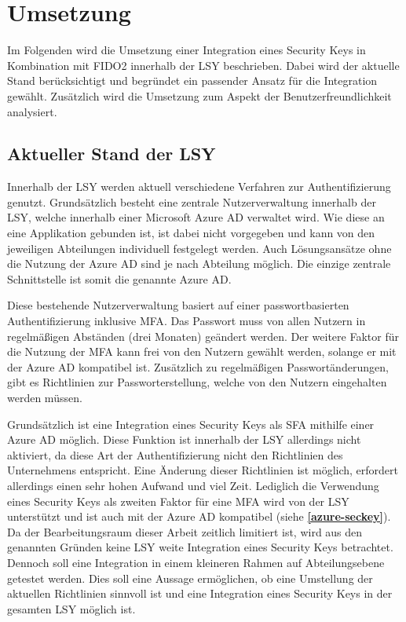 
\chapter{Umsetzung}
Im Folgenden wird die Umsetzung einer Integration eines Security Keys in Kombination mit \ac{FIDO}2 innerhalb der \ac{LSY} beschrieben. Dabei wird der aktuelle Stand berücksichtigt und begründet ein passender Ansatz für die Integration gewählt. Zusätzlich wird die Umsetzung zum Aspekt der Benutzerfreundlichkeit analysiert.

\section{Aktueller Stand der LSY} \label{current}
Innerhalb der \ac{LSY} werden aktuell verschiedene Verfahren zur Authentifizierung genutzt. Grundsätzlich besteht eine zentrale Nutzerverwaltung innerhalb der \ac{LSY}, welche innerhalb einer Microsoft Azure \ac{AD} verwaltet wird. Wie diese an eine Applikation gebunden ist, ist dabei nicht vorgegeben und kann von den jeweiligen Abteilungen individuell festgelegt werden. Auch Lösungsansätze ohne die Nutzung der Azure \ac{AD} sind je nach Abteilung möglich. Die einzige zentrale Schnittstelle ist somit die genannte Azure \ac{AD}.

Diese bestehende Nutzerverwaltung basiert auf einer passwortbasierten Authentifizierung inklusive \ac{MFA}. Das Passwort muss von allen Nutzern in regelmäßigen Abständen (drei Monaten) geändert werden. Der weitere Faktor für die Nutzung der \ac{MFA} kann frei von den Nutzern gewählt werden, solange er mit der Azure \ac{AD} kompatibel ist. Zusätzlich zu regelmäßigen Passwortänderungen, gibt es Richtlinien zur Passworterstellung, welche von den Nutzern eingehalten werden müssen. 

Grundsätzlich ist eine Integration eines Security Keys als \ac{SFA} mithilfe einer Azure \ac{AD} möglich. Diese Funktion ist innerhalb der \ac{LSY} allerdings nicht aktiviert, da diese Art der Authentifizierung nicht den Richtlinien des Unternehmens entspricht. Eine Änderung dieser Richtlinien ist möglich, erfordert allerdings einen sehr hohen Aufwand und viel Zeit. Lediglich die Verwendung eines Security Keys als zweiten Faktor für eine \ac{MFA} wird von der \ac{LSY} unterstützt und ist auch mit der Azure \ac{AD} kompatibel (siehe \textbf{\ref{azure-seckey}}). Da der Bearbeitungsraum dieser Arbeit zeitlich limitiert ist, wird aus den genannten Gründen keine \ac{LSY} weite Integration eines Security Keys betrachtet. Dennoch soll eine Integration in einem kleineren Rahmen auf Abteilungsebene getestet werden. Dies soll eine Aussage ermöglichen, ob eine Umstellung der aktuellen Richtlinien sinnvoll ist und eine Integration eines Security Keys in der gesamten \ac{LSY} möglich ist.

